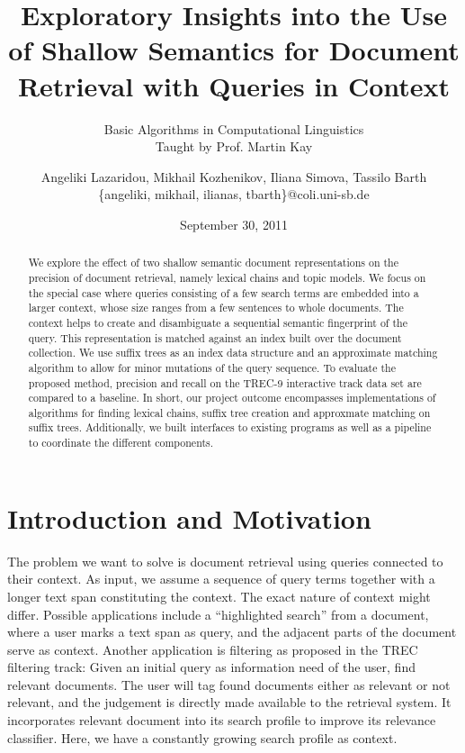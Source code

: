 \documentclass[11pt, a4paper, abstraction]{scrartcl}
\title{Exploratory Insights into the Use of Shallow Semantics for Document Retrieval with Queries in Context}
\author{Angeliki Lazaridou, Mikhail Kozhenikov, Iliana Simova, Tassilo Barth \\\{angeliki, mikhail, ilianas, tbarth\}@coli.uni-sb.de}
\date{September 30, 2011}
\subtitle{Basic Algorithms in Computational Linguistics \\ %
		Taught by Prof. Martin Kay}
\begin{document}
\maketitle

\begin{abstract}
We explore the effect of two shallow semantic document representations on the precision of document retrieval, namely lexical chains and topic models. We focus on the special case where queries consisting of a few search terms are embedded into a larger context, whose size ranges from a few sentences to whole documents. The context helps to create and disambiguate a sequential semantic fingerprint of the query. This representation is matched against an index built over the document collection. We use suffix trees as an index data structure and an approximate matching algorithm to allow for minor mutations of the query sequence. To evaluate the proposed method, precision and recall on the TREC-9 interactive track data set are compared to a baseline. In short, our project outcome encompasses implementations of algorithms for finding lexical chains, suffix tree creation and approxmate matching on suffix trees. Additionally, we built interfaces to existing programs as well as a pipeline to coordinate the different components.
\end{abstract}

\newpage

\tableofcontents

\newpage

\section{Introduction and Motivation}

The problem we want to solve is document retrieval using queries connected to their context. As input, we assume a sequence of query terms together with a longer text span constituting the context. The exact nature of context might differ. Possible applications include a ``highlighted search'' from a document, where a user marks a text span as query, and the adjacent parts of the document serve as context. Another application is filtering as proposed in the TREC filtering track: Given an initial query as information need of the user, find relevant documents. The user will tag found documents either as relevant or not relevant, and the judgement is directly made available to the retrieval system. It incorporates relevant document into its search profile to improve its relevance classifier. Here, we have a constantly growing search profile as context. \\       
\end{document}
